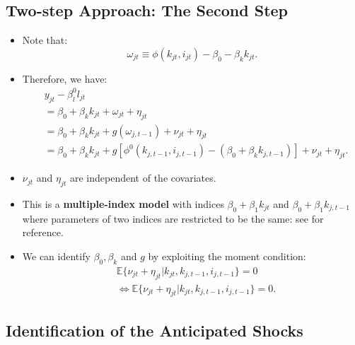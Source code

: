 \documentclass[
]{book}
\providecommand{\tightlist}{%
  \setlength{\itemsep}{0pt}\setlength{\parskip}{0pt}}
\begin{document}
\hypertarget{two-step-approach-the-second-step}{%
\subsection{Two-step Approach: The Second Step}\label{two-step-approach-the-second-step}}

\begin{itemize}
\tightlist
\item
  Note that:
  \begin{equation}
  \omega_{jt} \equiv \phi(k_{jt}, i_{jt}) - \beta_0 - \beta_k k_{jt}.
  \end{equation}
\item
  Therefore, we have:
  \begin{equation}
  \begin{split}
  &y_{jt} - \beta_l^0 l_{jt} \\
  &= \beta_0 + \beta_k k_{jt} + \omega_{jt} + \eta_{jt}\\
  &= \beta_0 + \beta_k k_{jt} + g(\omega_{j, t - 1}) + \nu_{jt} + \eta_{jt}\\
  &= \beta_0 + \beta_k k_{jt} + g[\phi^0(k_{j, t - 1}, i_{j, t - 1}) - (\beta_0 + \beta_k k_{j, t - 1})] + \nu_{jt} + \eta_{jt}.
  \end{split}
  \end{equation}
\item
  \(\nu_{jt}\) and \(\eta_{jt}\) are independent of the covariates.
\item
  This is a \textbf{multiple-index model} with indices \(\beta_0 + \beta_1 k_{jt}\) and \(\beta_0 + \beta_1 k_{j, t - 1}\) where parameters of two indices are restricted to be the same: see \citet{Ichimura2007} for reference.
\item
  We can identify \(\beta_0, \beta_k\) and \(g\) by exploiting the moment condition:
  \begin{equation}
  \begin{split}
  & \mathbb{E}\{\nu_{jt} + \eta_{jt}|k_{jt}, k_{j, t - 1}, i_{j, t - 1}\} = 0\\
  & \Leftrightarrow \mathbb{E}\{\nu_{jt} + \eta_{jt}|k_{jt}, k_{j, t - 1}, i_{j, t - 1}\} = 0.
  \end{split}
  \end{equation}
\end{itemize}

\hypertarget{identification-of-the-anticipated-shocks}{%
\subsection{Identification of the Anticipated Shocks}\label{identification-of-the-anticipated-shocks}}
\end{document}
